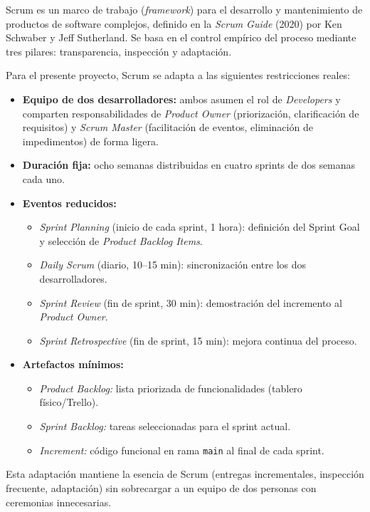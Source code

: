 \documentclass[12pt, letterpaper, oneside]{report}
\begin{document}
Scrum es un marco de trabajo (\emph{framework}) para el desarrollo y mantenimiento de productos de software complejos, definido en la \emph{Scrum Guide} (2020) por Ken Schwaber y Jeff Sutherland. Se basa en el control emp\'irico del proceso mediante tres pilares: transparencia, inspecci\'on y adaptaci\'on.

Para el presente proyecto, Scrum se adapta a las siguientes restricciones reales:

\begin{itemize}
  \item \textbf{Equipo de dos desarrolladores:} ambos asumen el rol de \emph{Developers} y comparten responsabilidades de \emph{Product Owner} (priorizaci\'on, clarificaci\'on de requisitos) y \emph{Scrum Master} (facilitaci\'on de eventos, eliminaci\'on de impedimentos) de forma ligera.
  \item \textbf{Duraci\'on fija:} ocho semanas distribuidas en cuatro sprints de dos semanas cada uno.
  \item \textbf{Eventos reducidos:}
    \begin{itemize}
      \item \emph{Sprint Planning} (inicio de cada sprint, 1 hora): definici\'on del Sprint Goal y selecci\'on de \emph{Product Backlog Items}.
      \item \emph{Daily Scrum} (diario, 10--15 min): sincronizaci\'on entre los dos desarrolladores.
      \item \emph{Sprint Review} (fin de sprint, 30 min): demostraci\'on del incremento al \emph{Product Owner}.
      \item \emph{Sprint Retrospective} (fin de sprint, 15 min): mejora continua del proceso.
    \end{itemize}
  \item \textbf{Artefactos m\'inimos:}
    \begin{itemize}
      \item \emph{Product Backlog:} lista priorizada de funcionalidades (tablero f\'isico/Trello).
      \item \emph{Sprint Backlog:} tareas seleccionadas para el sprint actual.
      \item \emph{Increment:} c\'odigo funcional en rama \texttt{main} al final de cada sprint.
    \end{itemize}
\end{itemize}

Esta adaptaci\'on mantiene la esencia de Scrum (entregas incrementales, inspecci\'on frecuente, adaptaci\'on) sin sobrecargar a un equipo de dos personas con ceremonias innecesarias.
\end{document}
